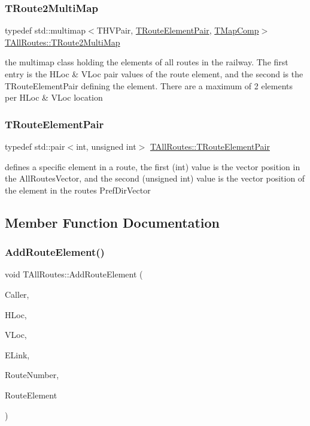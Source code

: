 \subsubsection{\texorpdfstring{T\+Route2\+Multi\+Map}{TRoute2MultiMap}}
{\footnotesize\ttfamily typedef std\+::multimap$<$T\+H\+V\+Pair, \mbox{\hyperlink{class_t_all_routes_a159a7d547e3d435d109a36cb41193a78}{T\+Route\+Element\+Pair}}, \mbox{\hyperlink{class_t_map_comp}{T\+Map\+Comp}}$>$ \mbox{\hyperlink{class_t_all_routes_a1d2aa3032df6e13d1f6f1a93f96157c6}{T\+All\+Routes\+::\+T\+Route2\+Multi\+Map}}}

the multimap class holding the elements of all routes in the railway. The first entry is the H\+Loc \& V\+Loc pair values of the route element, and the second is the T\+Route\+Element\+Pair defining the element. There are a maximum of 2 elements per H\+Loc \& V\+Loc location \mbox{\label{class_t_all_routes_a159a7d547e3d435d109a36cb41193a78}} 
\subsubsection{\texorpdfstring{T\+Route\+Element\+Pair}{TRouteElementPair}}
{\footnotesize\ttfamily typedef std\+::pair$<$int, unsigned int$>$ \mbox{\hyperlink{class_t_all_routes_a159a7d547e3d435d109a36cb41193a78}{T\+All\+Routes\+::\+T\+Route\+Element\+Pair}}}

defines a specific element in a route, the first (int) value is the vector position in the All\+Routes\+Vector, and the second (unsigned int) value is the vector position of the element in the route\textquotesingle{}s Pref\+Dir\+Vector 

\subsection{Member Function Documentation}
\mbox{\label{class_t_all_routes_a6eaa33fa8e8dcb44d0671be5889305a9}} 
\subsubsection{\texorpdfstring{Add\+Route\+Element()}{AddRouteElement()}}
{\footnotesize\ttfamily void T\+All\+Routes\+::\+Add\+Route\+Element (\begin{DoxyParamCaption}\item[{int}]{Caller,  }\item[{int}]{H\+Loc,  }\item[{int}]{V\+Loc,  }\item[{int}]{E\+Link,  }\item[{int}]{Route\+Number,  }\item[{\mbox{\hyperlink{class_t_pref_dir_element}{T\+Pref\+Dir\+Element}}}]{Route\+Element }\end{DoxyParamCaption})}


